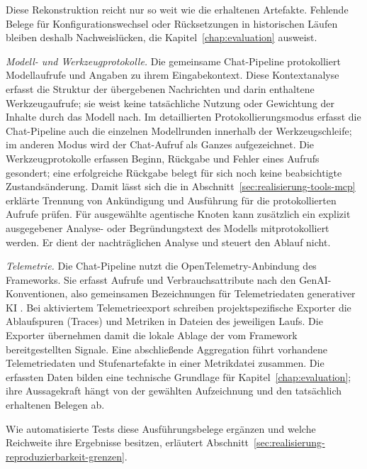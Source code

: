 Diese Rekonstruktion reicht nur so weit wie die erhaltenen
Artefakte. Fehlende Belege für Konfigurationswechsel oder
Rücksetzungen in historischen Läufen bleiben deshalb
Nachweislücken, die Kapitel~\ref{chap:evaluation} ausweist.

\emph{Modell- und Werkzeugprotokolle.} Die gemeinsame
Chat-Pipeline protokolliert Modellaufrufe und Angaben zu ihrem
Eingabekontext. Diese Kontextanalyse erfasst die Struktur der
übergebenen Nachrichten und darin enthaltene Werkzeugaufrufe;
sie weist keine tatsächliche Nutzung oder Gewichtung der Inhalte
durch das Modell nach. Im detaillierten Protokollierungsmodus erfasst
die Chat-Pipeline auch die einzelnen Modellrunden innerhalb der
Werkzeugschleife;
im anderen Modus wird der Chat-Aufruf als Ganzes aufgezeichnet.
Die Werkzeugprotokolle erfassen Beginn, Rückgabe und Fehler eines
Aufrufs gesondert; eine erfolgreiche Rückgabe belegt für sich noch
keine beabsichtigte Zustandsänderung. Damit lässt sich die in
Abschnitt~\ref{sec:realisierung-tools-mcp} erklärte Trennung von
Ankündigung und Ausführung für die protokollierten Aufrufe prüfen.
Für ausgewählte agentische Knoten kann zusätzlich ein explizit
ausgegebener Analyse- oder Begründungstext des Modells
mitprotokolliert werden. Er dient der nachträglichen Analyse und
steuert den Ablauf nicht.

\emph{Telemetrie.} Die Chat-Pipeline nutzt die
OpenTelemetry-Anbindung des Frameworks. Sie erfasst Aufrufe und
Verbrauchsattribute nach den GenAI-Konventionen, also gemeinsamen
Bezeichnungen für Telemetriedaten generativer KI \cite{msmaf2026agentobservability}.
Bei aktiviertem Telemetrieexport schreiben projektspezifische
Exporter die Ablaufspuren (Traces) und Metriken in Dateien des
jeweiligen Laufs. Die Exporter übernehmen damit die lokale Ablage
der vom Framework bereitgestellten Signale. Eine abschließende
Aggregation führt vorhandene Telemetriedaten und Stufenartefakte
in einer Metrikdatei zusammen. Die erfassten Daten bilden eine
technische Grundlage für Kapitel~\ref{chap:evaluation}; ihre
Aussagekraft hängt von der gewählten Aufzeichnung und den
tatsächlich erhaltenen Belegen ab.

Wie automatisierte Tests diese Ausführungsbelege ergänzen und
welche Reichweite ihre Ergebnisse besitzen, erläutert
Abschnitt~\ref{sec:realisierung-reproduzierbarkeit-grenzen}.

